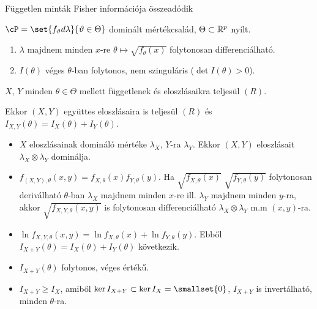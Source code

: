 \documentclass[aspectratio=169,notheorems,9pt,\option]{beamer}
\begin{document}
  \begin{frame}{Független minták Fisher információja összeadódik}
    \begin{df}
      $\cP=\set{f_\theta d\lambda}{\theta\in\Theta}$ dominált mértékcsalád, $\Theta\subset\mathbb{R}^p$ nyílt.
      \begin{enumerate}[<*>]
        \item $\lambda$ majdnem minden $x$-re $\theta\mapsto \sqrt{f_\theta(x)}$ folytonosan differenciálható.
        \item $I(\theta)$ véges $\theta$-ban folytonos, nem szinguláris ($\det I(\theta)>0$).
      \end{enumerate}
    \end{df}
    \begin{proposition}
      $X$, $Y$ minden $\theta\in\Theta$ mellett függetlenek és eloszlásaikra teljesül $(R)$.
  
      Ekkor $(X,Y)$ együttes eloszlásaira is teljesül $(R)$ és $I_{X,Y}(\theta)=I_{X}(\theta)+I_{Y}(\theta)$.
    \end{proposition}
    \begin{itemize}
      \item $X$ eloszlásainak domináló mértéke $\lambda_X$, $Y$-ra $\lambda_Y$. Ekkor $(X,Y)$ eloszlásait 
      $\lambda_X\otimes\lambda_Y$ dominálja. 
      \item $f_{(X,Y),\theta}(x,y)=f_{X,\theta}(x)f_{Y,\theta}(y)$. Ha $\sqrt{f_{X,\theta}(x)}$ $\sqrt{f_{Y,\theta}(y)}$ 
      folytonosan deriválható $\theta$-ban $\lambda_X$ majdnem minden $x$-re ill. $\lambda_Y$ majdnem minden $y$-ra, akkor 
      $\sqrt{f_{X,Y,\theta}(x,y)}$ is folytonosan differenciálható $\lambda_X\otimes\lambda_Y$ m.m $(x,y)$-ra. 
      \item $\ln f_{X,Y,\theta}(x,y)=\ln f_{X,\theta}(x)+\ln f_{Y,\theta}(y)$. 
      Ebből $I_{X+Y}(\theta)=I_X(\theta)+I_{Y}(\theta)$ következik. 
      \item $I_{X+Y}(\theta)$ folytonos, véges értékű.
      \item $I_{X+Y}\geq I_{X}$, amiből $\ker I_{X+Y}\subset \ker I_X=\smallset{0}$, 
      $I_{X+Y}$ is invertálható, minden $\theta$-ra.
    \end{itemize}
  \end{frame}
  
\end{document}
